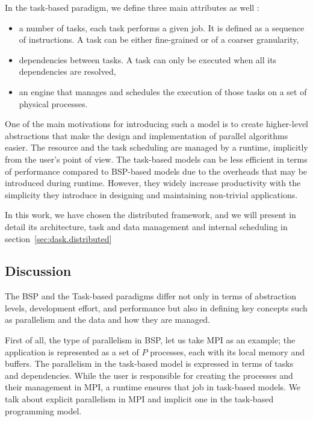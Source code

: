 

In the task-based paradigm, we define three main attributes as well :
\begin{itemize}
    \item a number of tasks, each task performs a given job. It is defined as a sequence of instructions. A task can be either fine-grained or of a coarser granularity, 
    \item dependencies between tasks. A task can only be executed when all its dependencies are resolved,
    \item an engine that manages and schedules the execution of those tasks on a set of physical processes.
\end{itemize}

One of the main motivations for introducing such a model is to create higher-level abstractions that make the design and implementation of parallel algorithms easier. The resource and the task scheduling are managed by a runtime, implicitly from the user's point of view. The task-based models can be less efficient in terms of performance compared to BSP-based models due to the overheads that may be introduced during runtime. However, they widely increase productivity with the simplicity they introduce in designing and maintaining non-trivial applications.   

In this work, we have chosen the \dask distributed framework, and we will present in detail its architecture, task and data management and internal scheduling in section~\ref{sec:dask.distributed} 

\subsection{Discussion} \label{Discussion}

The BSP and the Task-based paradigms differ not only in terms of abstraction levels, development effort, and performance but also in defining key concepts such as parallelism and the data and how they are managed.

First of all, the type of parallelism in BSP, let us take MPI as an example; the application is represented as a set of $P$ processes, each with its local memory and buffers. The parallelism in the task-based model is expressed in terms of tasks and dependencies. While the user is responsible for creating the processes and their management in MPI, a runtime ensures that job in task-based models. We talk about explicit parallelism in MPI and implicit one in the task-based programming model. 

